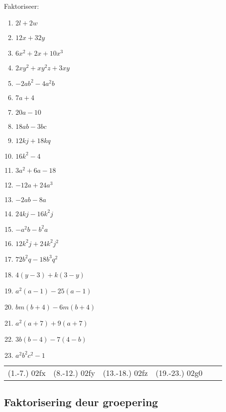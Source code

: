\begin{exercises}{}
{
Faktoriseer:
\begin{multicols}{2}
\begin{enumerate}[itemsep=5pt, label=\textbf{\arabic*}. ] 
\item $2l+2w$
\item $12x+32y$
\item $6{x}^{2}+2x+10{x}^{3}$
\item $2x{y}^{2}+x{y}^{2}z+3xy$
\item $-2a{b}^{2}-4{a}^{2}b$
\item $7a+4$ 
\item $20a-10$ 
\item $18ab-3bc$
\item $12kj+18kq$ 
\item $16{k}^{2}-4$ 
\item $3{a}^{2}+6a-18$
\item $-12a+24a^3$ 
\item $-2ab-8a$ 
\item $24kj-16{k}^{2}j$
\item $-{a}^{2}b-{b}^{2}a$ 
\item $12{k}^{2}j+24{k}^{2}{j}^{2}$ 
\item $72{b}^{2}q-18{b}^{3}{q}^{2}$
\item $4(y-3)+k(3-y)$ 
\item $a^2(a-1)-25(a-1)$ 
\item $bm(b+4)-6m(b+4)$
\item ${a}^{2}(a+7)+9(a+7)$ 
\item $3b(b-4)-7(4-b)$ 
\item ${a}^{2}{b}^{2}{c}^{2}-1$
\end{enumerate}
\end{multicols}

\par \practiceinfo
\par \begin{tabular}[h]{cccccc}
(1.-7.)	02fx	&
(8.-12.)	02fy	&
(13.-18.)	02fz	&
(19.-23.)	02g0	&

\end{tabular}
}
\end{exercises}

\subsection{Faktorisering deur groepering}
\nopagebreak

